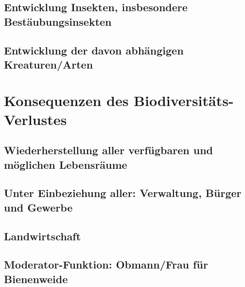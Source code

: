 \documentclass[
]{book}
\begin{document}
\hypertarget{entwicklung-insekten-insbesondere-bestuxe4ubungsinsekten}{%
\subsection{Entwicklung Insekten, insbesondere Bestäubungsinsekten}\label{entwicklung-insekten-insbesondere-bestuxe4ubungsinsekten}}

\hypertarget{entwicklung-der-davon-abhuxe4ngigen-kreaturenarten}{%
\subsection{Entwicklung der davon abhängigen Kreaturen/Arten}\label{entwicklung-der-davon-abhuxe4ngigen-kreaturenarten}}

\hypertarget{konsequenzen-des-biodiversituxe4ts-verlustes}{%
\section{Konsequenzen des Biodiversitäts-Verlustes}\label{konsequenzen-des-biodiversituxe4ts-verlustes}}

\hypertarget{wiederherstellung-aller-verfuxfcgbaren-und-muxf6glichen-lebensruxe4ume}{%
\subsection{Wiederherstellung aller verfügbaren und möglichen Lebensräume}\label{wiederherstellung-aller-verfuxfcgbaren-und-muxf6glichen-lebensruxe4ume}}

\hypertarget{unter-einbeziehung-aller-verwaltung-buxfcrger-und-gewerbe}{%
\subsection{Unter Einbeziehung aller: Verwaltung, Bürger und Gewerbe}\label{unter-einbeziehung-aller-verwaltung-buxfcrger-und-gewerbe}}

\hypertarget{landwirtschaft}{%
\subsection{Landwirtschaft}\label{landwirtschaft}}

\hypertarget{moderator-funktion-obmannfrau-fuxfcr-bienenweide}{%
\subsection{Moderator-Funktion: Obmann/Frau für Bienenweide}\label{moderator-funktion-obmannfrau-fuxfcr-bienenweide}}
\end{document}
